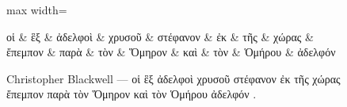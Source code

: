 \documentclass{article}
\begin{document}
\begin{figure}[ht]
\centering
\begin{adjustbox}{max width=\textwidth}
\begin{dependency}[theme = simple]
   \begin{deptext}[column sep=1.2em]
      οἱ \& ἓξ \& ἀδελφοὶ \& χρυσοῦ \& στέφανον \& ἐκ \& τῆς \& χώρας \& ἔπεμπον \& παρὰ \& τὸν \& Ὅμηρον \& καὶ \& τὸν \& Ὁμήρου \& ἀδελφόν \\
   \end{deptext}
\end{dependency}
\end{adjustbox}

\caption{Christopher Blackwell — οἱ ἓξ ἀδελφοὶ χρυσοῦ στέφανον ἐκ τῆς χώρας ἔπεμπον παρὰ τὸν Ὅμηρον καὶ τὸν Ὁμήρου ἀδελφόν .}
\end{figure}
\end{document}
